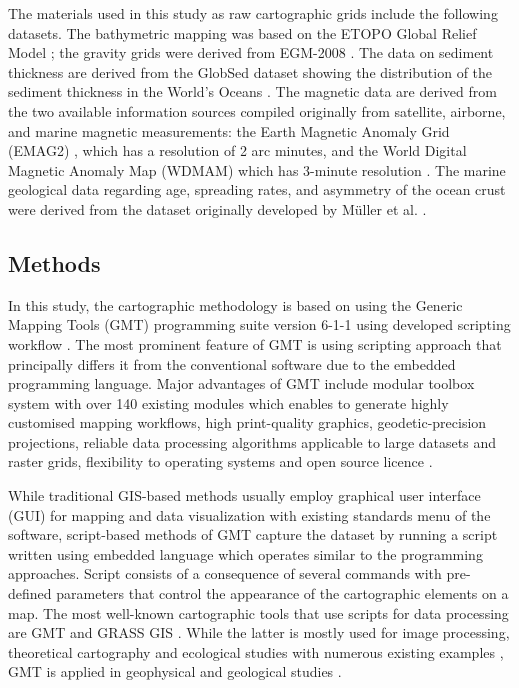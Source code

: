 \documentclass[land,article,submit,pdftex,moreauthors]{Definitions/mdpi}
\begin{document}
The materials used in this study as raw cartographic grids include the following datasets. The bathymetric mapping was based on the ETOPO Global Relief Model \cite{NOAA}; the gravity grids were derived from EGM-2008 \cite{Pavlis}. The data on sediment thickness are derived from the GlobSed dataset showing the distribution of the sediment thickness in the World's Oceans \cite{Straume}. The magnetic data are derived from the two available information sources compiled originally from satellite, airborne, and marine magnetic measurements: the Earth Magnetic Anomaly Grid (EMAG2) \cite{Maus}, which has a resolution of 2 arc minutes, and the World Digital Magnetic Anomaly Map (WDMAM) which has 3-minute resolution \cite{Lesur}. The marine geological data regarding age, spreading rates, and asymmetry of the ocean crust were derived from the dataset originally developed by Müller et al. \cite{Mueller}. 

\subsection{Methods}

 In this study, the cartographic methodology is based on using the Generic Mapping Tools (GMT) programming suite version 6-1-1 \cite{Wessel} using developed scripting workflow \cite{Lemenkova202212,Lemenkova202203}. The most prominent feature of GMT is using scripting approach that principally differs it from the conventional software due to the embedded programming language. Major advantages of GMT include modular toolbox system with over 140 existing modules which enables to generate highly customised mapping workflows, high print-quality graphics, geodetic-precision projections, reliable data processing algorithms applicable to large datasets and raster grids, flexibility to operating systems and open source licence \cite{WesselLuis}. 

While traditional GIS-based methods usually employ graphical user interface (GUI) for mapping and data visualization with existing standards menu of the software, script-based methods of GMT capture the dataset by running a script written using embedded language which operates similar to the programming approaches. Script consists of a consequence of several commands with pre-defined parameters that control the appearance of the cartographic elements on a map. The most well-known cartographic tools that use scripts for data processing are GMT \cite{Lemenkova202217} and GRASS GIS \cite{NETELER2012124}. While the latter is mostly used for image processing, theoretical cartography and ecological studies with numerous existing examples  \cite{ROCCHINI2017166,FRIGERI20111265,Lemenkova202313,SOROKINE2007685}, GMT is applied in geophysical and geological studies \cite{Lee,Lemenkova202206,DeSanto}.
\end{document}
